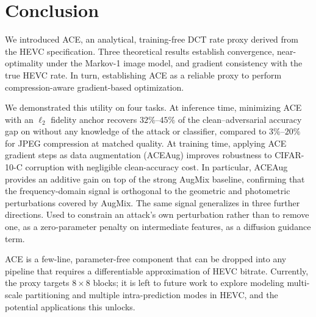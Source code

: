 \section{Conclusion}

We introduced ACE, an analytical, training-free DCT rate proxy derived from the HEVC specification.
Three theoretical results establish convergence, near-optimality under the Markov-1 image model, and gradient consistency with the true HEVC rate.
In turn, establishing ACE as a reliable proxy to perform compression-aware gradient-based optimization.

We demonstrated this utility on four tasks.
At inference time, minimizing ACE with an $\ell_2$ fidelity anchor recovers $32\%$--$45\%$ of the clean--adversarial accuracy gap on without any knowledge of the attack or classifier, compared to $3\%$--$20\%$ for JPEG compression at matched quality.
At training time, applying ACE gradient steps as data augmentation (ACEAug) improves robustness to CIFAR-10-C corruption with negligible clean-accuracy cost.
In particular, ACEAug provides an additive gain on top of the strong AugMix baseline, confirming that the frequency-domain signal is orthogonal to the geometric and photometric perturbations covered by AugMix.
The same signal generalizes in three further directions.
Used to constrain an attack's own perturbation rather than to remove one, as a zero-parameter penalty on intermediate features, as a diffusion guidance term.

ACE is a few-line, parameter-free component that can be dropped into any pipeline that requires a differentiable approximation of HEVC bitrate.
Currently, the proxy targets $8\times8$ blocks; it is left to future work to explore modeling multi-scale partitioning and multiple intra-prediction modes in HEVC, and the potential applications this unlocks.